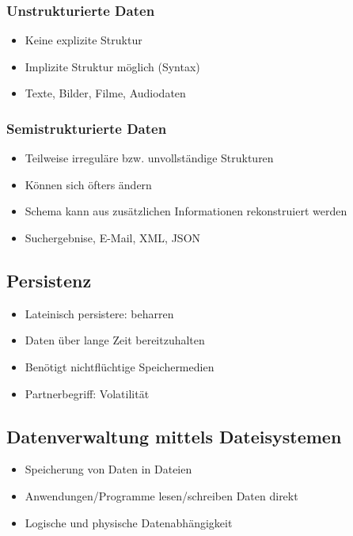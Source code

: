 \documentclass[8pt,a4paper]{scrartcl}
\begin{document}
\begin{multicols*}{3}
					\subsubsection{Unstrukturierte Daten}
						\begin{itemize}\itemsep0pt			
							\item Keine explizite Struktur
							\item Implizite Struktur möglich (Syntax)
							\item Texte, Bilder, Filme, Audiodaten
						\end{itemize}
						
					\subsubsection{Semistrukturierte Daten}
						\begin{itemize}\itemsep0pt			
							\item Teilweise irreguläre bzw. unvollständige Strukturen
							\item Können sich öfters ändern
							\item Schema kann aus zusätzlichen Informationen rekonstruiert werden
							\item Suchergebnise, E-Mail, XML, JSON
						\end{itemize}
						
			\subsection{Persistenz}
				\begin{itemize}\itemsep0pt			
					\item Lateinisch persistere: beharren
					\item Daten über lange Zeit bereitzuhalten
					\item Benötigt nichtflüchtige Speichermedien
					\item Partnerbegriff: Volatilität
				\end{itemize}
				
			\subsection{Datenverwaltung mittels Dateisystemen}
				\begin{itemize}\itemsep0pt			
					\item Speicherung von Daten in Dateien
					\item Anwendungen/Programme lesen/schreiben Daten direkt
					\item Logische und physische Datenabhängigkeit
				\end{itemize}
				

\end{multicols*}
\end{document}

